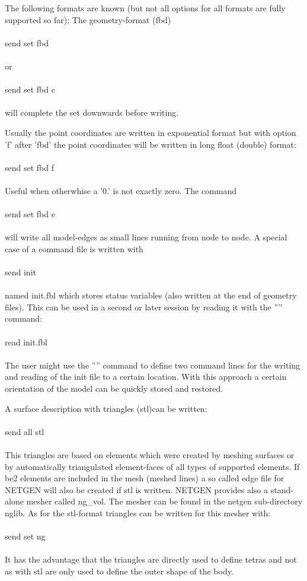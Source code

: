 \documentclass{article}
\begin{document}
The following formats are known (but not all options for all formats are fully supported so far); The geometry-format (fbd)\\\\send set fbd\\\\or\\\\send set fbd c\\\\will complete the set downwards before writing.

Usually the point coordinates are written in exponential format but with option 'f' after 'fbd' the point coordinates will be written in long float (double) format:\\\\send set fbd f\\\\Useful when otherwhise a '0.' is not exactly zero. The command \\\\send set fbd e\\\\will write all model-edges as small lines running from node to node. A special case of a command file is written with\\\\send init\\\\named init.fbl which stores status variables (also written at the end of geometry files). This can be used in a second or later session by reading it with the '''' command:\\\\read init.fbl\\\\The user might use the '''' command to define two command lines for the writing and reading of the init file to a certain location. With this approach a certain orientation of the model can be quickly stored and restored.

A surface description with triangles (stl)can be written:\\\\send all stl\\\\This triangles are based on elements which were created by meshing surfaces or by automatically triangulated element-faces of all types of supported elements. If be2 elements are included in the mesh (meshed lines) a so called edge file for NETGEN will also be created if stl is written. NETGEN provides also a stand-alone mesher called ng\_vol. The mesher can be found in the netgen sub-directory nglib. As for the stl-format triangles can be written for this mesher with:\\\\send set ng\\\\It has the advantage that the triangles are directly used to define tetras and not as with stl are only used to define the outer shape of the body.
\end{document}
